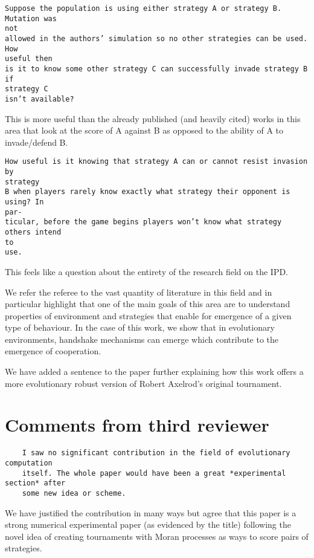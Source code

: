 \documentclass[a4]{article}
\begin{document}
\begin{verbatim}
Suppose the population is using either strategy A or strategy B. Mutation was
not
allowed in the authors’ simulation so no other strategies can be used. How
useful then
is it to know some other strategy C can successfully invade strategy B if
strategy C
isn’t available?
\end{verbatim}

This is more useful than the already published (and heavily cited) works in this
area that look at the score of A against B as opposed to the ability of A to
invade/defend B.

\begin{verbatim}
How useful is it knowing that strategy A can or cannot resist invasion by
strategy
B when players rarely know exactly what strategy their opponent is using? In
par-
ticular, before the game begins players won’t know what strategy others intend
to
use.
\end{verbatim}

This feels like a question about the entirety of the research field on the IPD.

We refer the referee to the vast quantity of literature in this field and in
particular highlight that one of the main goals of this area are to understand
properties of environment and strategies that enable for emergence of a given
type of behaviour. In the case of this work, we show that in evolutionary
environments, handshake mechanisms can emerge which contribute to the emergence
of cooperation.

We have added a sentence to the paper further explaining how this work offers a
more evolutionary robust version of Robert Axelrod's original tournament.

\section{Comments from third reviewer}

\begin{verbatim}
    I saw no significant contribution in the field of evolutionary computation
    itself. The whole paper would have been a great *experimental section* after
    some new idea or scheme.
\end{verbatim}

We have justified the contribution in many ways but agree that this paper is a
strong numerical experimental paper (as evidenced by the title) following the
novel idea of creating tournaments with Moran processes as ways to score pairs of
strategies.
\end{document}
